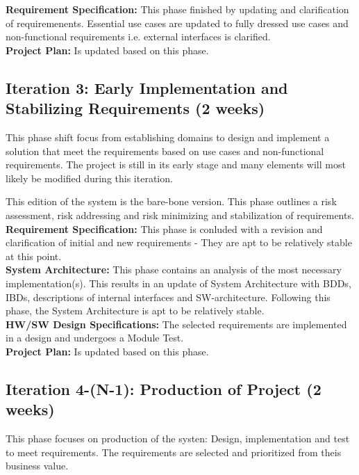 \textbf{Requirement Specification:} This phase finished by updating and clarification of requiremenents. Essential use cases are updated to fully dressed use cases and non-functional requirements i.e. external interfaces is clarified. \\

\textbf{Project Plan:} Is updated based on this phase.

\subsection{Iteration 3: Early Implementation and Stabilizing Requirements (2 weeks)}
This phase shift focus from establishing domains to design and implement a solution that meet the requirements based on use cases and non-functional requirements. The project is still in its early stage and many elements will most likely be modified during this iteration. \newline

This edition of the system is the bare-bone version. This phase outlines a risk assessment, risk addressing and risk minimizing and stabilization of requirements. \\

\textbf{Requirement Specification:} This phase is conluded with a revision and clarification of initial and new requirements - They are apt to be relatively stable at this point. \\

\textbf{System Architecture:} This phase contains an analysis of the most necessary implementation(s). This results in an update of System Architecture with BDDs, IBDs, descriptions of internal interfaces and SW-architecture. Following this phase, the System Architecture is apt to be relatively stable. \\

\textbf{HW/SW Design Specifications:} The selected requirements are implemented in a design and undergoes a Module Test. \\

\textbf{Project Plan:} Is updated based on this phase. \\

\subsection{Iteration 4-(N-1): Production of Project (2 weeks)}
This phase focuses on production of the systen: Design, implementation and test to meet requirements. The requirements are selected and prioritized from theis business value. \newline

